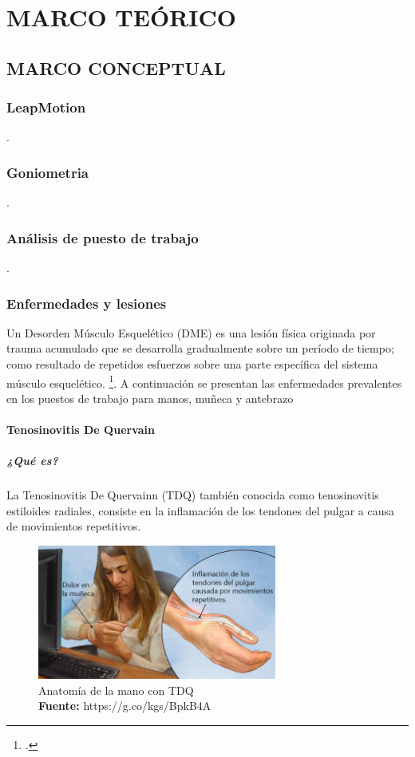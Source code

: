 \chapter{MARCO TEÓRICO}
\section{MARCO CONCEPTUAL}
\subsection{LeapMotion}
.
\subsection{Goniometria}
.
\subsection{Análisis de puesto de trabajo}
.
\subsection{Enfermedades y lesiones}
 Un Desorden Músculo Esquelético (DME) es una lesión física originada por trauma acumulado que se desarrolla gradualmente sobre un período de tiempo; como resultado de repetidos esfuerzos sobre una parte específica del sistema músculo esquelético. \footcite[]{MinisterioQue}. A continuación se presentan las enfermedades prevalentes en los puestos de trabajo para manos, muñeca y antebrazo

\subsubsection{Tenosinovitis De Quervain}
\paragraph{¿Qué es?}
La Tenosinovitis De Quervainn (TDQ) también conocida como tenosinovitis estiloides radiales, consiste en la inflamación de los tendones del pulgar a causa de movimientos repetitivos.

\begin{figure}[H]
    \centering
    \includegraphics[width=0.7\textwidth]{Anexos/LATEX/chapters/images/TDQ.jpg}
    \caption{Anatomía de la mano con TDQ \\\textbf{Fuente:} https://g.co/kgs/BpkB4A}
    \label{TDQ}
\end{figure}

